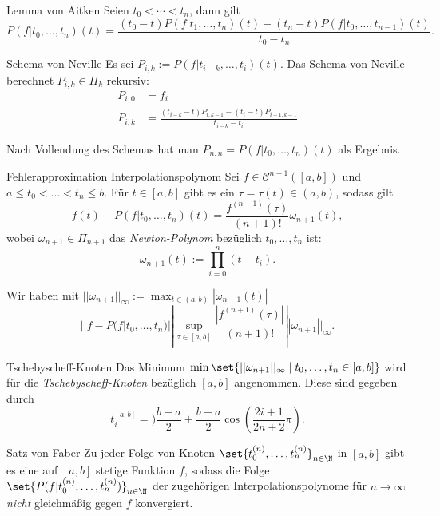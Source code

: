 \begin{karte}{Lemma von Aitken}
	Seien \( t_0 < \cdots < t_n \), dann gilt 
	\[ P(f|t_0,\ldots, t_n)(t) = \frac{ (t_0 - t)P(f|t_1,\ldots,t_n)(t) 
	- (t_n - t) P(f|t_0,\ldots, t_{n-1})(t) }{t_0 - t_n}. \]
\end{karte}

\begin{karte}{Schema von Neville}
	Es sei \( P_{i,k} := P(f|t_{i-k}, \ldots, t_i)(t) \).
	Das Schema von Neville berechnet \( P_{i,k} \in \Pi_k \) rekursiv:
	\begin{align*}
		P_{i,0} &= f_i \\
		P_{i,k} &= \frac{(t_{i-k} - t)P_{i, k-1} - (t_i - t) P_{i-1,k-1}}{t_{i-k} - t_i}
	\end{align*}

	Nach Vollendung des Schemas hat man \( P_{n,n} = P(f|t_0,\ldots,t_n)(t) \)
	als Ergebnis.
\end{karte}

\begin{karte}{Fehlerapproximation Interpolationspolynom}
	Sei \( f \in \mathcal{C}^{n+1}([a,b]) \) und \( a \leq t_0 < \ldots < t_n \leq b \).
	Für \(t\in [a,b]\) gibt es ein \( \tau = \tau(t) \in (a,b) \), sodass gilt 
	\[ f(t) - P(f|t_0,\ldots, t_n)(t) = \frac{f^{(n+1)}(\tau)}{(n+1)!}\omega_{n+1}(t), \]
	wobei \( \omega_{n+1} \in \Pi_{n+1} \) das \textit{Newton-Polynom} bezüglich 
	\( t_0, \ldots, t_n \) ist: 
	\[ \omega_{n+1}(t) := \prod_{i=0}^n (t - t_i). \]

	Wir haben mit \( ||\omega_{n+1}||_\infty := \max_{t\in (a,b)} | \omega_{n+1}(t)| \)
	\[ || f - P(f|t_0,\ldots, t_n) || \sup_{\tau \in [a,b]} \frac{ |f^{(n+1)}(\tau)| }{ (n+1)! } ||\omega_{n+1}||_\infty. \]
\end{karte}

\begin{karte}{Tschebyscheff-Knoten}
	Das Minimum \( \min\set{|| \omega_{n+1}||_\infty \;|\; t_0, \ldots, t_n \in [a,b] } \)
	wird für die \textit{Tschebyscheff-Knoten} bezüglich \([a,b]\) angenommen.
	Diese sind gegeben durch
	\[ t_i^{[a,b]} =) \frac{b+a}{2} + \frac{b-a}{2} \cos\left( \frac{2i + 1}{2n + 2} \pi \right). \]
\end{karte}

\begin{karte}{Satz von Faber}
	Zu jeder Folge von Knoten \( \set{t_0^{(n)}, \ldots, t_n^{(n)} }_{n\in\N} \) 
	in \( [a,b] \) gibt es eine auf \( [a,b] \) stetige Funktion \( f \), sodass 
	die Folge \( \set{P(f|t_0^{(n)}, \ldots, t_n^{(n)})}_{n\in\N} \) der zugehörigen 
	Interpolationspolynome für \( n\rightarrow \infty \) \textit{nicht} gleichmäßig gegen \(f\) konvergiert.
\end{karte}

